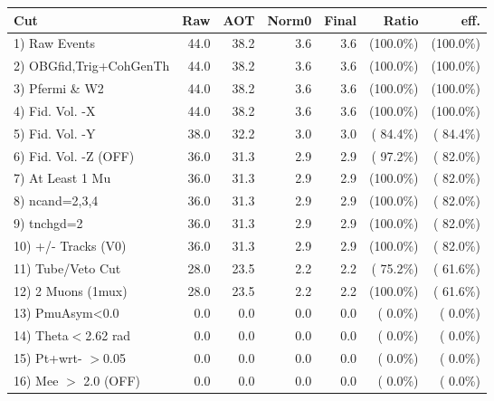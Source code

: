  \begin{table}[h!]\centering
 \begin{tabular}{||l||r|r|r|r|r|r||}
 \hline
 \hline
 Cut & Raw & AOT & Norm0 & Final & Ratio & eff.       \\
 \hline
  1) Raw Events           &         44.0 &         38.2 &          3.6 &          3.6 & (100.0\%) & (100.0\%) \\
  2) OBGfid,Trig+CohGenTh &         44.0 &         38.2 &          3.6 &          3.6 & (100.0\%) & (100.0\%) \\
  3) Pfermi \& W2         &         44.0 &         38.2 &          3.6 &          3.6 & (100.0\%) & (100.0\%) \\
  4) Fid. Vol. -X         &         44.0 &         38.2 &          3.6 &          3.6 & (100.0\%) & (100.0\%) \\
  5) Fid. Vol. -Y         &         38.0 &         32.2 &          3.0 &          3.0 & ( 84.4\%) & ( 84.4\%) \\
  6) Fid. Vol. -Z (OFF)   &         36.0 &         31.3 &          2.9 &          2.9 & ( 97.2\%) & ( 82.0\%) \\
  7) At Least 1 Mu        &         36.0 &         31.3 &          2.9 &          2.9 & (100.0\%) & ( 82.0\%) \\
  8) ncand=2,3,4          &         36.0 &         31.3 &          2.9 &          2.9 & (100.0\%) & ( 82.0\%) \\
  9) tnchgd=2             &         36.0 &         31.3 &          2.9 &          2.9 & (100.0\%) & ( 82.0\%) \\
 10) +/- Tracks (V0)      &         36.0 &         31.3 &          2.9 &          2.9 & (100.0\%) & ( 82.0\%) \\
 11) Tube/Veto Cut        &         28.0 &         23.5 &          2.2 &          2.2 & ( 75.2\%) & ( 61.6\%) \\
 12) 2 Muons (1mux)       &         28.0 &         23.5 &          2.2 &          2.2 & (100.0\%) & ( 61.6\%) \\
 13) PmuAsym<0.0          &          0.0 &          0.0 &          0.0 &          0.0 & (  0.0\%) & (  0.0\%) \\
 14) Theta$<$2.62 rad     &          0.0 &          0.0 &          0.0 &          0.0 & (  0.0\%) & (  0.0\%) \\
 15) Pt+wrt- $>$0.05      &          0.0 &          0.0 &          0.0 &          0.0 & (  0.0\%) & (  0.0\%) \\
 16) Mee $>$ 2.0  (OFF)   &          0.0 &          0.0 &          0.0 &          0.0 & (  0.0\%) & (  0.0\%) \\

\end{tabular}
\end{table}

